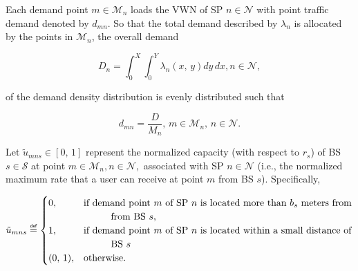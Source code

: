 \documentclass[12pt,dvipsnames]{report}
\newif\ifisdoublespacing
\newcommand\defeq{\mathrel{\overset{\makebox[0pt]{\mbox{\normalfont\tiny\sffamily def}}}{=}}}
\newcommand\tab[1][1cm]{\hspace*{#1}}
\begin{document}
Each demand point $m \in \mathcal{M}_n$ loads the VWN of SP $n \in \mathcal{N}$ with point traffic demand denoted by $d_{mn}$.  So that the total demand described by $\lambda_n$ is allocated by the points in $\mathcal{M}_n$, the overall demand 

\begin{equation} \label{eq:demandintegral}
D_n = \int_0^X \int_0^Y \lambda_n\left( x,\, y \right) dy \, dx, n \in \mathcal{N},
\end{equation}

\noindent of the demand density distribution is evenly distributed such that

\begin{equation} \label{eq:pointdemand}
d_{mn} = \frac{D}{M_n},\, m \in \mathcal{M}_n,\, n \in \mathcal{N}.
\end{equation}

Let $\tilde{u}_{mns} \in \left[ 0,\, 1 \right]$ represent the normalized capacity (with respect to $r_s$) of BS $s \in \mathcal{S}$ at point $m \in \mathcal{M}_n, n \in \mathcal{N},$ associated with SP $n \in \mathcal{N}$ (i.e., the normalized maximum rate that a user can receive at point $m$ from BS $s$).  Specifically,

\ifisdoublespacing
\begin{singlespacing}
\begin{equation} \label{eq:umns}
\tilde{u}_{mns} \defeq
	\begin{cases}
		0,& \text{if demand point $m$ of SP $n$ is located more than $b_s$ meters from}\\
		& \text{\tab from BS $s$;}\\
		\\
		1,& \text{if demand point $m$ of SP $n$ is located within a small distance of}\\
		& \text{\tab BS $s$;}\\
		\\
		(0,\, 1),& \text{otherwise.}
	\end{cases}
\end{equation}
\end{singlespacing}
\else
\begin{equation} \label{eq:umns}
\tilde{u}_{mns} \defeq
	\begin{cases}
		0,& \text{if demand point $m$ of SP $n$ is located more than $b_s$ meters from}\\
		& \text{\tab from BS $s$,}\\
		1,& \text{if demand point $m$ of SP $n$ is located within a small distance of}\\
		& \text{\tab BS $s$}\\
		(0,\, 1),& \text{otherwise.}
	\end{cases}
\end{equation}
\fi
\end{document}

